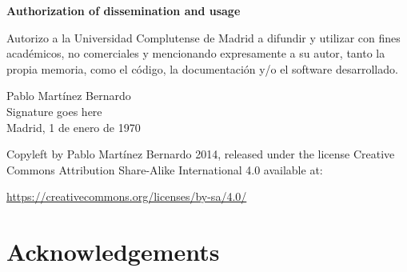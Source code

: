 
\newpage
\thispagestyle{empty}
\begin{center}
  \textbf{\Huge Authorization of dissemination and usage}
\end{center}
\vfill
Autorizo a la Universidad Complutense de Madrid a difundir y utilizar con fines académicos, no comerciales y mencionando expresamente a su autor, tanto la propia memoria, como el código, la documentación y/o el software desarrollado. 
\begin{center}
  \vfill
  {\Large Pablo Martínez Bernardo\\}
  \vspace*{1cm}
  {\Huge Signature goes here\\}
  \vspace*{1cm}
  {\Large Madrid, 1 de enero de 1970}
  \vfill
\end{center}
  Copyleft by Pablo Martínez Bernardo 2014, released under the license Creative Commons Attribution Share-Alike International 4.0 available at:
\begin{center}
\url{https://creativecommons.org/licenses/by-sa/4.0/}
\end{center}

\newpage
\thispagestyle{empty}
\section*{Acknowledgements}

\newpage
\tableofcontents
\newpage
\setcounter{page}{6}
\listoffigures
\listoftables
\newpage
